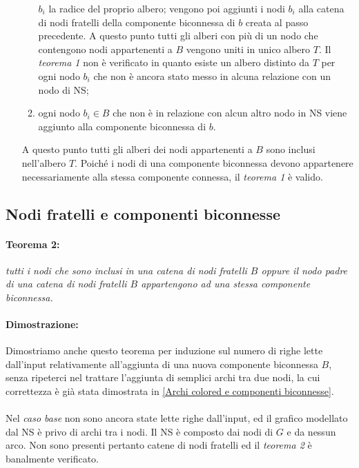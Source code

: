 \documentclass[a4paper,11pt]{report}
\begin{document}
\begin{enumerate}
\begin{enumerate}
$b_i$ la radice del proprio albero; vengono poi aggiunti i nodi $b_i$ alla
catena di nodi fratelli della componente biconnessa di $b$ creata al passo precedente. A questo punto tutti gli alberi con più di un nodo
che contengono nodi appartenenti a $B$ vengono uniti in unico albero $T$.
Il \emph{teorema 1} non è verificato in quanto esiste un albero distinto da $T$ per ogni nodo $b_i$ che non è ancora stato messo in alcuna
relazione con un nodo di NS;
  \item ogni nodo $b_i\in B$ che non è in relazione con alcun altro nodo in NS viene aggiunto alla componente biconnessa di $b$. 
 \end{enumerate}
A questo punto tutti gli alberi dei nodi appartenenti a $B$ sono inclusi nell'albero $T$. Poiché i nodi di una componente biconnessa devono
appartenere necessariamente alla stessa 
componente connessa, il \emph{teorema 1} è valido.
\end{enumerate}

\subsection{Nodi fratelli e componenti biconnesse}
\paragraph{Teorema 2:}\emph{tutti i nodi che sono inclusi in una catena di nodi fratelli $B$ oppure il nodo padre di una catena di nodi
fratelli $B$ appartengono ad una stessa componente biconnessa.}
\paragraph{Dimostrazione:}Dimostriamo anche questo teorema per induzione sul numero di righe lette dall'input relativamente all'aggiunta di
una nuova componente biconnessa 
$B$, senza ripeterci nel trattare l'aggiunta di semplici archi tra due nodi, la cui correttezza è già stata dimostrata in \ref{Archi colored
e componenti biconnesse}.
\paragraph{}
Nel \emph{caso base} non sono ancora state lette righe dall'input, ed il grafico modellato dal NS è privo di archi tra i nodi. Il NS è
composto dai nodi di $G$ e da nessun arco. Non sono presenti
pertanto catene di nodi fratelli ed il \emph{teorema 2} è banalmente verificato.
\end{document}
